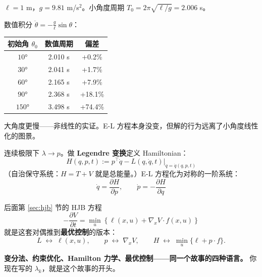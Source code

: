 \documentclass[12pt, a4paper]{ctexart}
\begin{document}
\begin{blackboard}

$\ell = 1$ m，$g = 9.81$ m/s$^2$。小角度周期 $T_0 = 2\pi\sqrt{\ell/g} = 2.006$ s。

数值积分 $\ddot\theta = -\frac{g}{\ell}\sin\theta$：
\begin{center}
\begin{tabular}{c|c|c}
\toprule
初始角 $\theta_0$ & 数值周期 & 偏差 \\
\midrule
$10°$  & 2.010 s & +0.2\% \\
$30°$  & 2.041 s & +1.7\% \\
$60°$  & 2.165 s & +7.9\% \\
$90°$  & 2.368 s & +18.1\% \\
$150°$ & 3.498 s & +74.4\% \\
\bottomrule
\end{tabular}
\end{center}
大角度更慢——非线性的实证。E-L 方程本身没变，但解的行为远离了小角度线性化的图景。

\end{blackboard}



\begin{insight}

连续极限下 $\lambda \to p$。做 \textbf{Legendre 变换}定义 Hamiltonian：
\[
H(q, p, t) := p^\top \dot q - L(q, \dot q, t)\Big|_{\dot q = \dot q(q, p, t)}
\]
（自治保守系统：$H = T + V$ 就是总能量。）E-L 方程化为对称的一阶系统：
\[
\dot q = \frac{\partial H}{\partial p},\qquad
\dot p = -\frac{\partial H}{\partial q}
\]

后面第 \ref{sec:hjb} 节的 HJB 方程
\[
-\frac{\partial V}{\partial t} = \min_u\left\{\ell(x,u) + \nabla_x V \cdot f(x, u)\right\}
\]
就是这套对偶推到\textbf{最优控制}的版本：
\[
L \;\leftrightarrow\; \ell(x, u),\qquad
p \;\leftrightarrow\; \nabla_x V,\qquad
H \;\leftrightarrow\; \min_u\{\ell + p\cdot f\}.
\]

\textbf{变分法、约束优化、Hamilton 力学、最优控制——同一个故事的四种语言。}
你现在写的 $\lambda_k$，就是这个故事的开头。
\end{insight}

\end{document}
